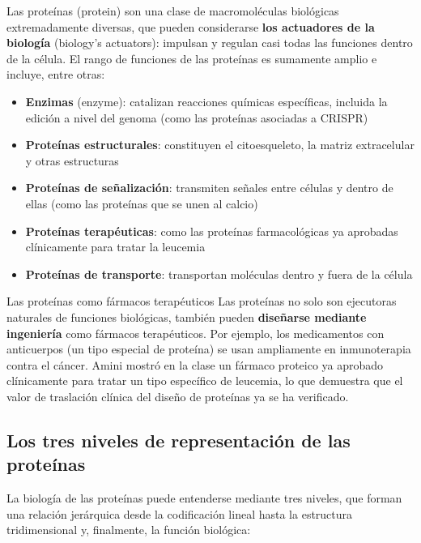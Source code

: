 \documentclass[a4paper]{article}
\begin{document}
Las proteínas (protein) son una clase de macromoléculas biológicas extremadamente diversas, que pueden considerarse \textbf{los actuadores de la biología} (biology's actuators): impulsan y regulan casi todas las funciones dentro de la célula. El rango de funciones de las proteínas es sumamente amplio e incluye, entre otras:

\begin{itemize}
    \item \textbf{Enzimas} (enzyme): catalizan reacciones químicas específicas, incluida la edición a nivel del genoma (como las proteínas asociadas a CRISPR)
    \item \textbf{Proteínas estructurales}: constituyen el citoesqueleto, la matriz extracelular y otras estructuras
    \item \textbf{Proteínas de señalización}: transmiten señales entre células y dentro de ellas (como las proteínas que se unen al calcio)
    \item \textbf{Proteínas terapéuticas}: como las proteínas farmacológicas ya aprobadas clínicamente para tratar la leucemia
    \item \textbf{Proteínas de transporte}: transportan moléculas dentro y fuera de la célula
\end{itemize}

\begin{knowledgebox}{Las proteínas como fármacos terapéuticos}
Las proteínas no solo son ejecutoras naturales de funciones biológicas, también pueden \textbf{diseñarse mediante ingeniería} como fármacos terapéuticos. Por ejemplo, los medicamentos con anticuerpos (un tipo especial de proteína) se usan ampliamente en inmunoterapia contra el cáncer. Amini mostró en la clase un fármaco proteico ya aprobado clínicamente para tratar un tipo específico de leucemia, lo que demuestra que el valor de traslación clínica del diseño de proteínas ya se ha verificado.
\end{knowledgebox}

\subsection{Los tres niveles de representación de las proteínas}

La biología de las proteínas puede entenderse mediante tres niveles, que forman una relación jerárquica desde la codificación lineal hasta la estructura tridimensional y, finalmente, la función biológica:
\end{document}
